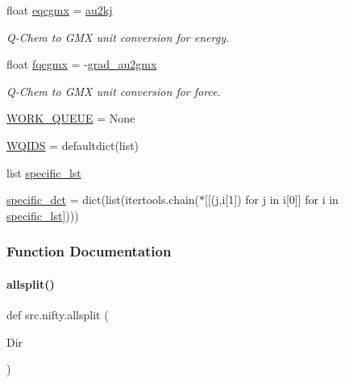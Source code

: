 \begin{DoxyCompactItemize}
\item 
float \hyperlink{namespacesrc_1_1nifty_a336ab008c5b45507d15011307bb646fa}{eqcgmx} = \hyperlink{namespacesrc_1_1nifty_af5788f33a1e5a2d91f1dba0b7dc00f3e}{au2kj}
\begin{DoxyCompactList}\small\item\em Q-\/\+Chem to G\+MX unit conversion for energy. \end{DoxyCompactList}\item 
float \hyperlink{namespacesrc_1_1nifty_aa32fe291eb06cebb82b4fc736fbb7e1f}{fqcgmx} = -\/\hyperlink{namespacesrc_1_1nifty_a829aae1bd9a882de17c5348ecbc4a5b4}{grad\+\_\+au2gmx}
\begin{DoxyCompactList}\small\item\em Q-\/\+Chem to G\+MX unit conversion for force. \end{DoxyCompactList}\item 
\hyperlink{namespacesrc_1_1nifty_a98086a96e0c85d13c21412af5e4ca530}{W\+O\+R\+K\+\_\+\+Q\+U\+E\+UE} = None
\item 
\hyperlink{namespacesrc_1_1nifty_ab7bf1fc7894a18063e8ff929225c4457}{W\+Q\+I\+DS} = defaultdict(list)
\item 
list \hyperlink{namespacesrc_1_1nifty_a85e464a26ad72d93b9560c9e7fb5b949}{specific\+\_\+lst}
\item 
\hyperlink{namespacesrc_1_1nifty_acf4022cbb593c9dff0a1305d52d02c06}{specific\+\_\+dct} = dict(list(itertools.\+chain($\ast$\mbox{[}\mbox{[}(j,i\mbox{[}1\mbox{]}) for j in i\mbox{[}0\mbox{]}\mbox{]} for i in \hyperlink{namespacesrc_1_1nifty_a85e464a26ad72d93b9560c9e7fb5b949}{specific\+\_\+lst}\mbox{]})))
\end{DoxyCompactItemize}


\subsubsection{Function Documentation}
\mbox{\label{namespacesrc_1_1nifty_a18cbb1a44578e68dde486deac3089f77}} 
\paragraph{\texorpdfstring{allsplit()}{allsplit()}}
{\footnotesize\ttfamily def src.\+nifty.\+allsplit (\begin{DoxyParamCaption}\item[{}]{Dir }\end{DoxyParamCaption})}



